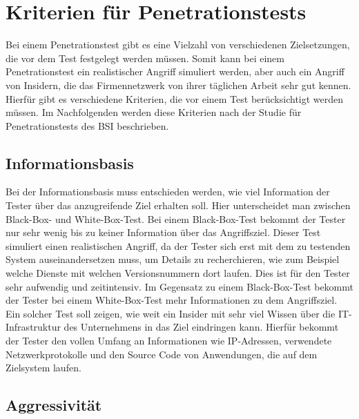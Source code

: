 \section{Kriterien für Penetrationstests}

Bei einem Penetrationstest gibt es eine Vielzahl von verschiedenen Zielsetzungen, die vor dem Test festgelegt
werden müssen. Somit kann bei einem Penetrationstest ein realistischer Angriff simuliert werden, aber auch
ein Angriff von Insidern, die das Firmennetzwerk von ihrer täglichen Arbeit sehr gut kennen. Hierfür gibt es
verschiedene Kriterien, die vor einem Test berücksichtigt werden müssen. Im Nachfolgenden werden diese
Kriterien nach der Studie für Penetrationstests des BSI\cite[13--17]{pt03bsi} beschrieben.

\subsection{Informationsbasis}

Bei der Informationsbasis muss entschieden werden, wie viel Information der Tester über das anzugreifende
Ziel erhalten soll. Hier unterscheidet man zwischen Black-Box- und White-Box-Test. Bei einem Black-Box-Test bekommt der Tester nur sehr wenig bis zu keiner Information über das Angriffsziel. Dieser Test simuliert einen realistischen Angriff, da der Tester sich erst mit dem zu testenden System auseinandersetzen muss, um Details zu recherchieren, wie zum Beispiel welche Dienste mit welchen Versionsnummern
dort laufen. Dies ist für den Tester sehr aufwendig und zeitintensiv. Im Gegensatz zu einem Black-Box-Test bekommt der Tester bei einem White-Box-Test mehr Informationen zu dem Angriffsziel. Ein solcher Test soll zeigen, wie weit ein Insider mit sehr viel Wissen über die IT-Infrastruktur des Unternehmens in das Ziel eindringen kann. Hierfür bekommt der Tester den vollen Umfang
an Informationen wie IP-Adressen, verwendete Netzwerkprotokolle und den Source Code von Anwendungen,
die auf dem Zielsystem laufen.

\subsection{Aggressivität}

